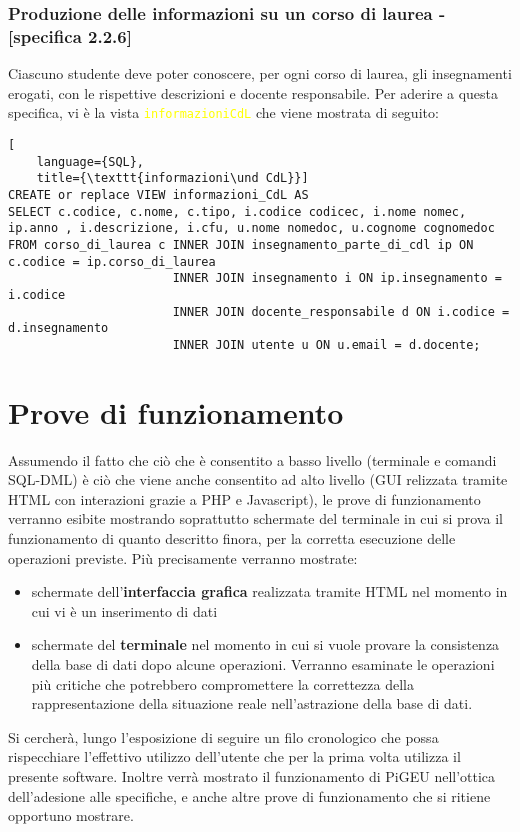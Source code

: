 \documentclass{article}
\newcommand{\sqlview}[1]{\texttt{\textcolor{yellow}{#1}}}
\newcommand{\und}[0]{\textunderscore}
\begin{document}
\subsubsection{Produzione delle informazioni su un corso di laurea - [specifica 2.2.6]}
Ciascuno studente deve poter conoscere, per ogni corso di laurea, gli insegnamenti erogati, con le rispettive descrizioni e docente responsabile. Per aderire a questa specifica, vi è la vista \sqlview{informazioni\und CdL} che viene mostrata di seguito:
\begin{lstlisting}[
    language={SQL},
    title={\texttt{informazioni\und CdL}}]
CREATE or replace VIEW informazioni_CdL AS
SELECT c.codice, c.nome, c.tipo, i.codice codicec, i.nome nomec, ip.anno , i.descrizione, i.cfu, u.nome nomedoc, u.cognome cognomedoc
FROM corso_di_laurea c INNER JOIN insegnamento_parte_di_cdl ip ON c.codice = ip.corso_di_laurea
                       INNER JOIN insegnamento i ON ip.insegnamento = i.codice
                       INNER JOIN docente_responsabile d ON i.codice = d.insegnamento
                       INNER JOIN utente u ON u.email = d.docente;
\end{lstlisting}
\section{Prove di funzionamento}
Assumendo il fatto che ciò che è consentito a basso livello (terminale e comandi SQL-DML) è ciò che viene anche consentito ad alto livello (GUI relizzata tramite HTML con interazioni grazie a PHP e Javascript), le prove di funzionamento verranno esibite mostrando soprattutto schermate del terminale in cui si prova il funzionamento di quanto descritto finora, per la corretta esecuzione delle operazioni previste. Più precisamente verranno mostrate:
\begin{itemize}
    \item schermate dell'\textbf{interfaccia grafica} realizzata tramite HTML nel momento in cui vi è un inserimento di dati
    \item schermate del \textbf{terminale} nel momento in cui si vuole provare la consistenza della base di dati dopo alcune operazioni. Verranno esaminate le operazioni più critiche che potrebbero compromettere la correttezza della rappresentazione della situazione reale nell'astrazione della base di dati.
\end{itemize}
Si cercherà, lungo l'esposizione di seguire un filo cronologico che possa rispecchiare l'effettivo utilizzo dell'utente che per la prima volta utilizza il presente software. Inoltre verrà mostrato il funzionamento di PiGEU nell'ottica dell'adesione alle specifiche, e anche altre prove di funzionamento che si ritiene opportuno mostrare.
\end{document}
